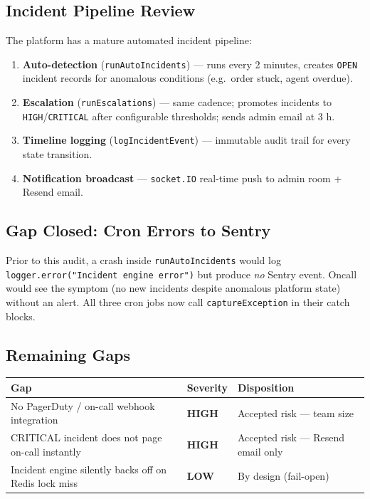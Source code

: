 \documentclass[12pt,a4paper]{article}
\newcommand{\cellok}[1]{\cellcolor{ok!15}\textbf{\color{ok}#1}}
\newcommand{\cellwarn}[1]{\cellcolor{warn!20}\textbf{\color{warn}#1}}
\begin{document}
\subsection{Incident Pipeline Review}

The platform has a mature automated incident pipeline:

\begin{enumerate}[leftmargin=*]
  \item \textbf{Auto-detection} (\texttt{runAutoIncidents}) — runs every 2 minutes,
        creates \texttt{OPEN} incident records for anomalous conditions (e.g.\ order
        stuck, agent overdue).
  \item \textbf{Escalation} (\texttt{runEscalations}) — same cadence; promotes
        incidents to \texttt{HIGH}/\texttt{CRITICAL} after configurable thresholds;
        sends admin email at 3 h.
  \item \textbf{Timeline logging} (\texttt{logIncidentEvent}) — immutable audit trail
        for every state transition.
  \item \textbf{Notification broadcast} — \texttt{socket.IO} real-time push to admin
        room + Resend email.
\end{enumerate}

\subsection{Gap Closed: Cron Errors to Sentry}

Prior to this audit, a crash inside \texttt{runAutoIncidents} would log
\texttt{logger.error("Incident engine error")} but produce \emph{no} Sentry event.
Oncall would see the symptom (no new incidents despite anomalous platform state)
without an alert.  All three cron jobs now call \texttt{captureException} in
their catch blocks.

\subsection{Remaining Gaps}

\begin{longtable}{p{6cm}p{3cm}p{5cm}}
\toprule
\rowcolor{tableheadbg}
\textbf{\color{white}Gap} & \textbf{\color{white}Severity} & \textbf{\color{white}Disposition} \\
\midrule
No PagerDuty / on-call webhook integration & \cellwarn{HIGH} & Accepted risk — team size \\
CRITICAL incident does not page on-call instantly & \cellwarn{HIGH} & Accepted risk — Resend email only \\
Incident engine silently backs off on Redis lock miss & \cellok{LOW} & By design (fail-open) \\
\bottomrule
\end{longtable}
\end{document}
